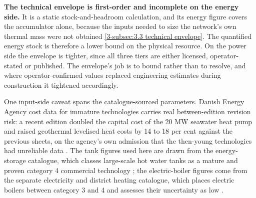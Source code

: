 \textbf{The technical envelope is first-order and incomplete on the energy side.} It is a static stock-and-headroom calculation, and its energy figure covers the accumulator alone, because the inputs needed to size the network's own thermal mass were not obtained \autoref{3-subsec:3.3 technical envelope}. The quantified energy stock is therefore a lower bound on the physical resource. On the power side the envelope is tighter, since all three tiers are either licensed, operator-stated or published. The envelope's job is to bound rather than to resolve, and where operator-confirmed values replaced engineering estimates during construction it tightened accordingly.

One input-side caveat spans the catalogue-sourced parameters. Danish Energy Agency cost data for immature technologies carries real between-edition revision risk: a recent edition doubled the capital cost of the 20 MW seawater heat pump and raised geothermal levelised heat costs by 14 to 18 per cent against the previous sheets, on the agency's own admission that the then-young technologies had unreliable data \cite{danish_energy_agency_energy_2025}. The tank figures used here are drawn from the energy-storage catalogue, which classes large-scale hot water tanks as a mature and proven category 4 commercial technology \cite{danish_energy_agency_energy_2025}; the electric-boiler figures come from the separate electricity and district heating catalogue, which places electric boilers between category 3 and 4 and assesses their uncertainty as low \cite{danish_energy_agency_technology_2024}.